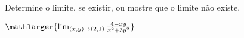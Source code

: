 Determine o limite, se existir, ou mostre que o limite não existe.

$\mathlarger{\lim_{(x,y)\rightarrow(2,1)} \frac{4-xy}{x^2+3y^2}}$

